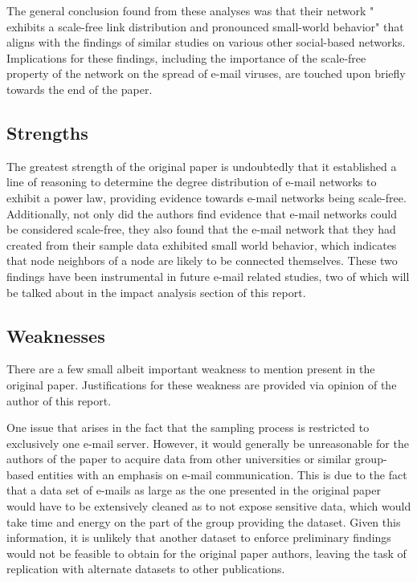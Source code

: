 \documentclass[a4paper]{article}
\begin{document}
\begin{multicols}{2}
The general conclusion found from these analyses was that their network " exhibits a scale-free link distribution and pronounced small-world behavior" \cite{1} that aligns with the findings of similar studies on various other social-based networks. Implications for these findings, including the importance of the scale-free property of the network on the spread of e-mail viruses, are touched upon briefly towards the end of the paper. 

\subsection{Strengths}
\hspace*{\parindent}The greatest strength of the original paper is undoubtedly that it established a line of reasoning to determine the degree distribution of e-mail networks to exhibit a power law, providing evidence towards e-mail networks being scale-free. Additionally, not only did the authors find evidence that e-mail networks could be considered scale-free, they also found that the e-mail network that they had created from their sample data exhibited small world behavior, which indicates that node neighbors of a node are likely to be connected themselves. These two findings have been instrumental in future e-mail related studies, two of which will be talked about in the impact analysis section of this report.	

\subsection{Weaknesses}
\hspace*{\parindent}There are a few small albeit important weakness to mention present in the original paper. Justifications for these weakness are provided via opinion of the author of this report.

One issue that arises in the fact that the sampling process is restricted to exclusively one e-mail server. However, it would generally be unreasonable for the authors of the paper to acquire data from other universities or similar group-based entities with an emphasis on e-mail communication. This is due to the fact that a data set of e-mails as large as the one presented in the original paper would have to be extensively cleaned as to not expose sensitive data, which would take time and energy on the part of the group providing the dataset. Given this information, it is unlikely that another dataset to enforce preliminary findings would not be feasible to obtain for the original paper authors, leaving the task of replication with alternate datasets to other publications.


\end{multicols}
\end{document}
